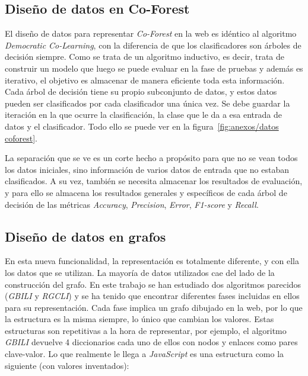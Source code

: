 \subsection{Diseño de datos en Co-Forest}
El diseño de datos para representar \textit{Co-Forest} en la web es idéntico al algoritmo \textit{Democratic Co-Learning}, con la diferencia de que los clasificadores son árboles de decisión siempre. Como se trata de un algoritmo inductivo, es decir, trata de construir un modelo que luego se puede evaluar en la fase de pruebas y además es iterativo, el objetivo es almacenar de manera eficiente toda esta información. Cada árbol de decisión tiene su propio subconjunto de datos, y estos datos pueden ser clasificados por cada clasificador una única vez. Se debe guardar la iteración en la que ocurre la clasificación, la clase que le da a esa entrada de datos y el clasificador. Todo ello se puede ver en la figura~\ref{fig:anexos/datos coforest}.


La separación que se ve es un corte hecho a propósito para que no se vean todos los datos iniciales, sino información de varios datos de entrada que no estaban clasificados.
A su vez, también se necesita almacenar los resultados de evaluación, y para ello se almacena los resultados generales y específicos de cada árbol de decisión de las métricas \textit{Accuracy}, \textit{Precision}, \textit{Error}, \textit{F1-score} y \textit{Recall}.
\subsection{Diseño de datos en grafos}
En esta nueva funcionalidad, la representación es totalmente diferente, y con ella los datos que se utilizan. La mayoría de datos utilizados cae del lado de la construcción del grafo. En este trabajo se han estudiado dos algoritmos parecidos (\textit{GBILI} y \textit{RGCLI}) y se ha tenido que encontrar diferentes fases incluidas en ellos para su representación. Cada fase implica un grafo dibujado en la web, por lo que la estructura es la misma siempre, lo único que cambian los valores. Estas estructuras son repetitivas a la hora de representar, por ejemplo, el algoritmo \textit{GBILI} devuelve 4 diccionarios cada uno de ellos con nodos y enlaces como pares clave-valor. Lo que realmente le llega a \textit{JavaScript} es una estructura como la siguiente (con valores inventados): 

